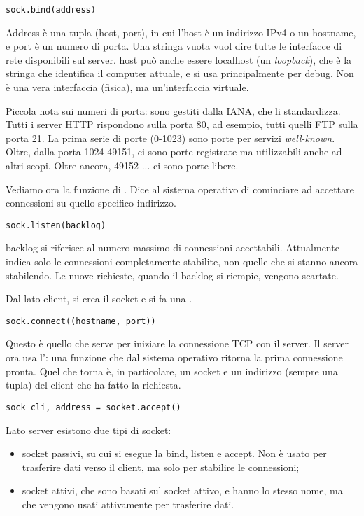 \begin{verbatim}
sock.bind(address)
\end{verbatim}

Address \`e una tupla (host, port), in cui l'host \`e un indirizzo IPv4 o un hostname, e port \`e un numero di porta. Una stringa vuota vuol dire tutte le interfacce di rete disponibili sul server. host pu\`o anche essere localhost (un \emph{loopback}), che \`e la stringa che identifica il computer attuale, e si usa principalmente per debug. Non \`e una vera interfaccia (fisica), ma un'interfaccia virtuale.

Piccola nota sui numeri di porta: sono gestiti dalla IANA, che li standardizza. Tutti i server HTTP rispondono sulla porta 80, ad esempio, tutti quelli FTP sulla porta 21. La prima serie di porte (0-1023) sono porte per servizi \emph{well-known}. Oltre, dalla porta 1024-49151, ci sono porte registrate ma utilizzabili anche ad altri scopi. Oltre ancora, 49152-... ci sono porte libere.

Vediamo ora la funzione di . Dice al sistema operativo di cominciare ad accettare connessioni su quello specifico indirizzo.

\begin{verbatim}
sock.listen(backlog)
\end{verbatim}

backlog si riferisce al numero massimo di connessioni accettabili. Attualmente indica solo le connessioni completamente stabilite, non quelle che si stanno ancora stabilendo. Le nuove richieste, quando il backlog si riempie, vengono scartate.

Dal lato client, si crea il socket e si fa una .

\begin{verbatim}
sock.connect((hostname, port))
\end{verbatim}

Questo \`e quello che serve per iniziare la connessione TCP con il server. Il server ora usa l': una funzione che dal sistema operativo ritorna la prima connessione pronta. Quel che torna \`e, in particolare, un socket e un indirizzo (sempre una tupla) del client che ha fatto la richiesta.

\begin{verbatim}
sock_cli, address = socket.accept()
\end{verbatim}

Lato server esistono due tipi di socket:
\begin{itemize}
    \item socket passivi, su cui si esegue la bind, listen e accept. Non \`e usato per trasferire dati verso il client, ma solo per stabilire le connessioni;
    \item socket attivi, che sono basati sul socket attivo, e hanno lo stesso nome, ma che vengono usati attivamente per trasferire dati.
\end{itemize}

